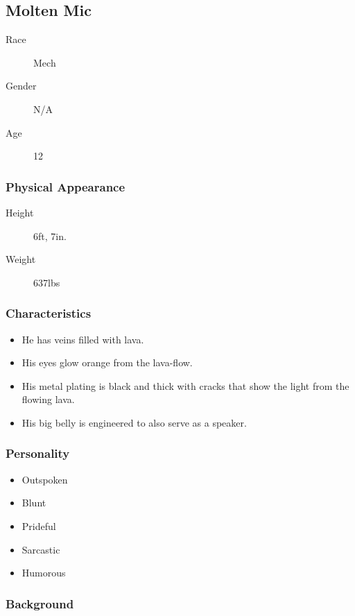 \subsection{Molten Mic}

\begin{description}
    \item[Race] Mech
    \item[Gender] N/A
    \item[Age] 12  
\end{description}

\subsubsection{Physical Appearance}

\begin{description}
    \item[Height] 6ft, 7in.
    \item[Weight] 637lbs
\end{description}

\subsubsection{Characteristics}

\begin{itemize}
    \item He has veins filled with lava.
    \item His eyes glow orange from the lava-flow.
    \item His metal plating is black and thick with cracks that show the light from the flowing lava.
    \item His big belly is engineered to also serve as a speaker.
\end{itemize}

\subsubsection{Personality}

\begin{itemize}
    \item Outspoken
    \item Blunt
    \item Prideful
    \item Sarcastic
    \item Humorous
\end{itemize}

\subsubsection{Background}

